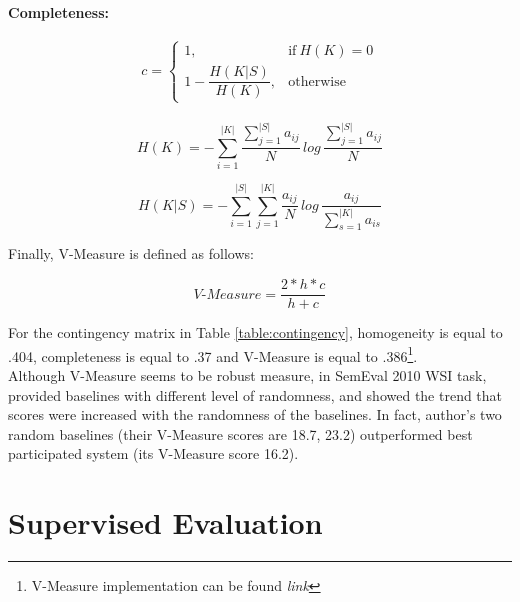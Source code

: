 \paragraph{Completeness:}

\begin{equation}
    c =
    \begin{cases}
      1, & \text{if}\ H(K) = 0 \\
      1 - \dfrac{H(K|S)}{H(K)}, & \text{otherwise}
    \end{cases}
  \end{equation} \\
  
\begin{equation}
H(K) = -\sum\limits_{i = 1}^{|K|} \dfrac{\sum_{j=1}^{|S|}a_{ij}}{N}\,log\, \dfrac{\sum_{j=1}^{|S|}a_{ij}}{N}
\end{equation}

\begin{equation}
H(K|S) = -\sum\limits_{i = 1}^{|S|} \sum\limits_{j = 1}^{|K|} \dfrac{a_{ij}}{N}\,log\, \dfrac{a_{ij}}{\sum_{s=1}^{|K|}a_{is}}
\end{equation}

Finally, V-Measure is defined as follows: 

\begin{equation}
\textit{V-Measure} = \dfrac{2 * h * c}{h + c}
\end{equation}


For the contingency matrix in Table \ref{table:contingency}, homogeneity is equal to .404, completeness is equal to .37 and V-Measure is equal to .386\footnote{V-Measure implementation can be found \emph{link}}. \\

Although V-Measure seems to be robust measure, in SemEval 2010 WSI task, \cite{pedersen10duluth} provided baselines with different level of randomness, and showed the trend that scores were increased with the randomness of the baselines. In fact, author's two random baselines (their V-Measure scores are 18.7, 23.2) outperformed best participated system (its V-Measure score 16.2).

\section{Supervised Evaluation}
\label{section:supervised-eval}
